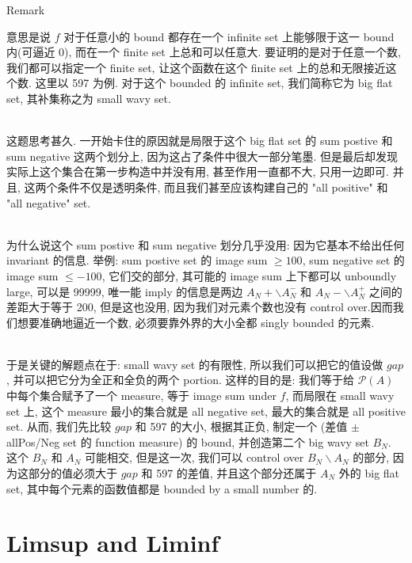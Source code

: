 \documentclass{qlnotes-export}
\begin{document}
\begin{qlremark}{Remark}

意思是说 \(f\) 对于任意小的 bound 都存在一个 infinite set 上能够限于这一 bound 内(可逼近 0), 而在一个 finite set 上总和可以任意大. 要证明的是对于任意一个数, 我们都可以指定一个 finite set, 让这个函数在这个 finite set 上的总和无限接近这个数. 这里以 597 为例. 对于这个 bounded 的 infinite set, 我们简称它为 big flat set, 其补集称之为 small wavy set.\\
\strut \\
这题思考甚久. 一开始卡住的原因就是局限于这个 big flat set 的 sum postive 和 sum negative 这两个划分上, 因为这占了条件中很大一部分笔墨. 但是最后却发现实际上这个集合在第一步构造中并没有用, 甚至作用一直都不大, 只用一边即可. 并且, 这两个条件不仅是透明条件, 而且我们甚至应该构建自己的 "all positive" 和 "all negative" set.\\
\strut \\
为什么说这个 sum postive 和 sum negative 划分几乎没用: 因为它基本不给出任何 invariant 的信息. 举例: sum postive set 的 image sum \(\geq 100\), sum negative set 的 image sum \(\leq - 100\), 它们交的部分, 其可能的 image sum 上下都可以 unboundly large, 可以是 99999, 唯一能 imply 的信息是两边 \(A_{N} + \backslash A_{N}^{-}\) 和 \(A_{N} - \backslash A_{N}^{+}\) 之间的差距大于等于 200, 但是这也没用, 因为我们对元素个数也没有 control over.因而我们想要准确地逼近一个数, 必须要靠外界的大小全都 singly bounded 的元素.\\
\strut \\
于是关键的解题点在于: small wavy set 的有限性, 所以我们可以把它的值设做 \(gap\), 并可以把它分为全正和全负的两个 portion. 这样的目的是: 我们等于给 \(\mathcal{P}(A)\) 中每个集合赋予了一个 measure, 等于 image sum under \(f\), 而局限在 small wavy set 上, 这个 measure 最小的集合就是 all negative set, 最大的集合就是 all positive set. 从而, 我们先比较 \(gap\) 和 597 的大小, 根据其正负, 制定一个 (差值 \(\pm\) allPos/Neg set 的 function measure) 的 bound, 并创造第二个 big wavy set \(B_{N}\). 这个 \(B_{N}\) 和 \(A_{N}\) 可能相交, 但是这一次, 我们可以 control over \(B_{N}\backslash A_{N}\) 的部分, 因为这部分的值必须大于 \(gap\) 和 597 的差值, 并且这个部分还属于 \(A_{N}\) 外的 big flat set, 其中每个元素的函数值都是 bounded by a small number 的.

\end{qlremark}

\section{Limsup and Liminf}\label{limsup-and-liminf}
\end{document}
